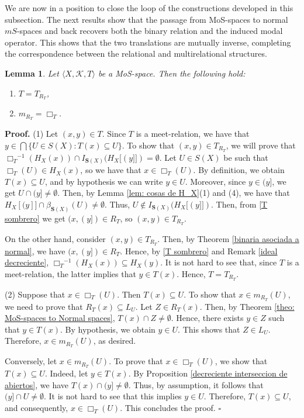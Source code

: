\documentclass{article}
\newtheorem{lemma}{\bf Lemma}[section]
\newenvironment{proof}
{\par\noindent\textbf{Proof. }\rm}
{\hfill$\boldsymbol{\square}$\par\vspace{0.3cm}}
\begin{document}
We are now in a position to close the loop of the constructions developed in this subsection. The next results show that the passage from MoS-spaces to normal $mS$-spaces and back recovers both the binary relation and the induced modal operator. This shows that the two translations are mutually inverse, completing the correspondence between the relational and multirelational structures.

\begin{lemma}\label{T=T_R_T}    
Let $\langle X, \mathcal{K}, T \rangle$ be a MoS-space. Then the following hold:
\begin{enumerate}
    \item $T = T_{R_T}$,
    \item $m_{R_T} = \Box_{T}$.
\end{enumerate}
\end{lemma}
\begin{proof} 
(1) Let $(x,y) \in T$. Since $T$ is a meet-relation, we have that $y \in \bigcap\{U \in S(X)\colon T(x)\subseteq U\}$. To show that $(x,y)\in T_{R_T}$, we will prove that ${\Box_T}^{-1}(H_X(x))\cap {I_{\mathbf{S}(X)}(H_X[(y]])}=\emptyset$. Let $U \in S(X)$ be such that $\Box_T(U) \in H_X(x)$, so we have that $x \in \Box_T(U)$. By definition, we obtain $T(x)\subseteq U$, and by hypothesis we can write $y \in U$. Moreover, since $y \in (y]$, we get $U \cap (y]\neq\emptyset$. Then, by Lemma \ref{lem: cosas de H_X}(1) and (4), we have that $H_X[(y]] \cap \beta_{\mathbf{S}(X)}(U)\neq \emptyset$. Thus, $U \notin {I_{\mathbf{S}(X)}(H_X[(y]])}$. Then, from \eqref{T sombrero} we get $(x,(y]) \in R_T$, so $(x,y) \in T_{R_T}$. 

On the other hand, consider $(x,y) \in T_{R_T}$. Then, by Theorem \ref{binaria asociada a normal}, we have $(x,(y]) \in R_T$. Hence, by \eqref{T sombrero} and Remark \ref{ideal decreciente}, ${\Box_T}^{-1}(H_X(x))\subseteq H_X(y)$. It is not hard to see that, since $T$ is a meet-relation, the latter implies that $y\in T(x)$. Hence, $T=T_{R_T}$.

(2) Suppose that $x\in \Box_T(U)$. Then $T(x)\subseteq U$. To show that $x\in m_{R_T}(U)$, we need to prove that $R_T(x)\subseteq L_U$. Let $Z\in R_T(x)$. Then, by Theorem \ref{theo: MoS-spaces to Normal spaces}, $T(x)\cap Z\neq \emptyset$. Hence, there exists $y\in Z$ such that $y\in T(x)$. By hypothesis, we obtain $y\in U$. This shows that $Z\in L_U$. Therefore, $x\in m_{R_T}(U)$, as desired.

Conversely, let $x\in m_{R_T}(U)$. To prove that $x\in \Box_T(U)$, we show that $T(x)\subseteq U$. Indeed, let $y\in T(x)$. By Proposition \ref{decreciente interseccion de abiertos}, we have $T(x)\cap (y]\neq \emptyset$. Thus, by assumption, it follows that $(y]\cap U \neq \emptyset$. It is not hard to see that this implies $y\in U$. Therefore, $T(x)\subseteq U$, and consequently, $x\in \Box_T(U)$. This concludes the proof.
\end{proof}
\end{document}
